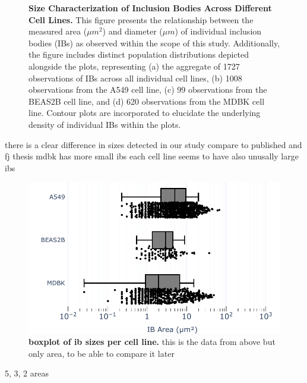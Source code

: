 \begin{figure}
    \caption[Size Characterization of Inclusion Bodies Across Different Cell Lines.]{\textbf{Size Characterization of Inclusion Bodies Across Different Cell Lines.} This figure presents the relationship between the measured area (\(\mu m^2\)) and diameter (\(\mu m\)) of individual inclusion bodies (IBs) as observed within the scope of this study. Additionally, the figure includes distinct population distributions depicted alongside the plots, representing (a) the aggregate of 1727 observations of IBs across all individual cell lines, (b) 1008 observations from the A549 cell line, (c) 99 observations from the BEAS2B cell line, and (d) 620 observations from the MDBK cell line. Contour plots are incorporated to elucidate the underlying density of individual IBs within the plots.}
    \label{fig:Size Characterization of Inclusion Bodies Across Different Cell Lines}  
\end{figure}

there is a clear difference in sizes detected in our study
compare to published and fj thesis
mdbk has more small ibs
each cell line seems to have also unusally large ibs


\begin{figure}
    \centering
    \includegraphics[width=1\linewidth]{08. Chapter 3/Figs/01. Localisation introduction/06. box-infection.pdf}
    \caption[boxplot of ib sizes per cell line.]{\textbf{boxplot of ib sizes per cell line.} this is the data from above but only area, to be able to compare it later}
    \label{fig:boxplot of ib sizes per cell line}
\end{figure}

5, 3, 2 areas